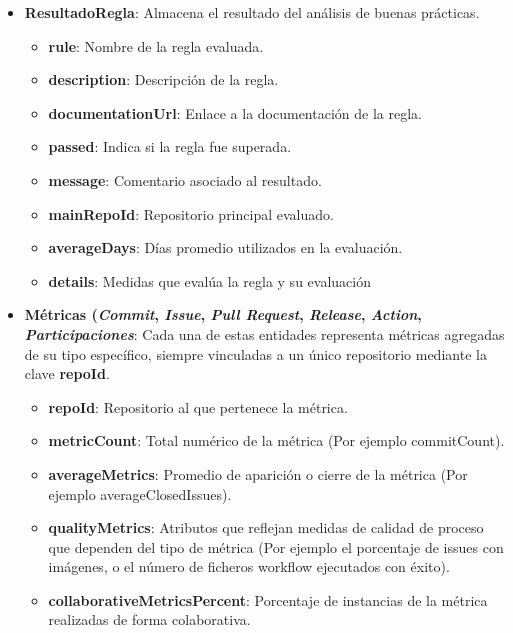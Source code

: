 \begin{itemize}
	\item \textbf{ResultadoRegla}: Almacena el resultado del análisis de buenas prácticas.
		\begin{itemize}
			\item \textbf{rule}: Nombre de la regla evaluada.
			\item \textbf{description}: Descripción de la regla.
			\item \textbf{documentationUrl}: Enlace a la documentación de la regla.
			\item \textbf{passed}: Indica si la regla fue superada.
			\item \textbf{message}: Comentario asociado al resultado.
			\item \textbf{mainRepoId}: Repositorio principal evaluado.
			\item \textbf{averageDays}: Días promedio utilizados en la evaluación.
            \item \textbf{details}: Medidas que evalúa la regla y su evaluación
		\end{itemize}

	\item \textbf{Métricas (\textit{Commit}, \textit{Issue}, \textit{Pull Request}, \textit{Release}, \textit{Action}, \textit{Participaciones}}: Cada una de estas entidades representa métricas agregadas de su tipo específico, siempre vinculadas a un único repositorio mediante la clave \textbf{repoId}.
		\begin{itemize}
			\item \textbf{repoId}: Repositorio al que pertenece la métrica.
			\item \textbf{metricCount}: Total numérico de la métrica (Por ejemplo commitCount).
			\item \textbf{averageMetrics}: Promedio de aparición o cierre de la métrica (Por ejemplo averageClosedIssues).
			\item \textbf{qualityMetrics}: Atributos que reflejan medidas de calidad de proceso que dependen del tipo de métrica (Por ejemplo el porcentaje de issues con imágenes, o el número de ficheros workflow ejecutados con éxito).
			\item \textbf{collaborativeMetricsPercent}: Porcentaje de instancias de la métrica realizadas de forma colaborativa.
		\end{itemize}
    \end{itemize}

